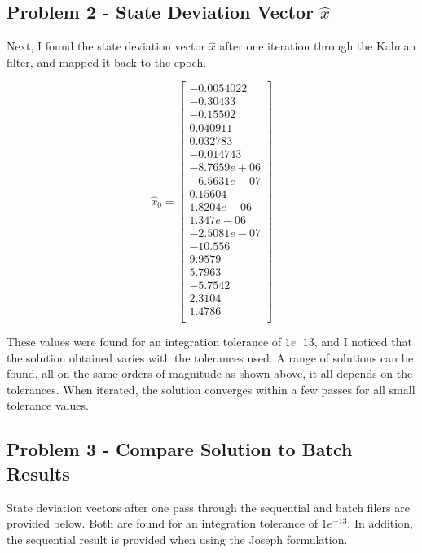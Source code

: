 \documentclass[]{article}
\newcommand{\brackets} [1] {\left[ #1 \right]}
\begin{document}
\subsection{ Problem 2 - State Deviation Vector $\hat{x}$ }
Next, I found the state deviation vector $\hat{x}$ after one iteration through the Kalman filter, and mapped it back to the epoch. 

\begin{displaymath}
	\hat{x}_0  =  
	\brackets{\begin{array}{c}
	   -0.0054022	\\
	     -0.30433	\\
	     -0.15502	\\
	     0.040911	\\
	     0.032783	\\
	    -0.014743	\\
	  -8.7659e+06	\\
	  -6.5631e-07	\\
	      0.15604	\\
	   1.8204e-06	\\
	    1.347e-06	\\
 	 -2.5081e-07	\\
 	     -10.556	\\
 	      9.9579	\\
 	      5.7963	\\
 	     -5.7542	\\
 	      2.3104	\\
	       1.4786	\\
	\end{array}}
\end{displaymath}

These values were found for an integration tolerance of $1e^-{13}$, and I noticed that the solution obtained varies with the tolerances used. A range of solutions can be found, all on the same orders of magnitude as shown above, it all depends on the tolerances. When iterated, the solution converges within a few passes for all small tolerance values.


\subsection{Problem 3 - Compare Solution to Batch Results}
State deviation vectors after one pass through the sequential and batch filers are provided below. Both are found for an integration tolerance of $1e^{-13}$. In addition, the sequential result is provided when using the Joseph formulation. 
\end{document}
